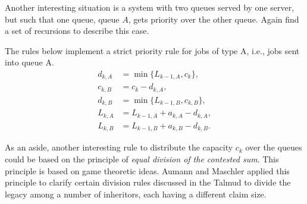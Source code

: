 \begin{exercise}  Another interesting situation is
    a system with two queues served by one server, but such that one
    queue, queue $A$, gets priority over the other
    queue. Again find a set of recursions to describe this case.
    \begin{solution}
      The rules below implement a strict priority rule for jobs of type
      A, i.e., jobs sent into queue A.
\begin{equation*}
  \begin{split}
    d_{k,A} &= \min\{L_{k-1, A}, c_k\}, \\
    c_{k,B} &= c_k - d_{k,A}, \\
    d_{k,B} &= \min\{L_{k-1, B}, c_{k,B}\}, \\
    L_{k,A} &= L_{k-1, A} + a_{k,A} - d_{k,A}, \\
    L_{k,B} &= L_{k-1, B} + a_{k,B} - d_{k,B}.
  \end{split}
\end{equation*}

As an aside, another interesting rule to distribute the capacity $c_k$
over the queues could be based on the principle of \textit{ equal
  division of the contested sum}. This principle is based on game
theoretic ideas. Aumann and Maschler applied this principle to clarify
certain division rules discussed in the Talmud to divide the legacy
among a number of inheritors, each having a different claim size.
    \end{solution}
\end{exercise}



